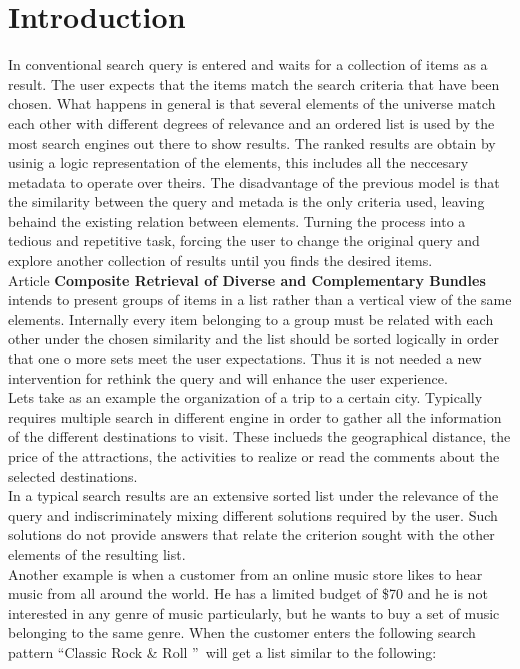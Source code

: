 
\section{Introduction}
In conventional search query is entered and waits for a collection of items as a result. The user expects that the items match the search criteria that have been chosen. What happens in general is that several elements of the universe match each other with different degrees of relevance and an ordered list is used by the most search engines out there to show results. The ranked results are obtain by usinig a logic representation of the elements, this includes all the neccesary metadata to operate over theirs. The disadvantage of the previous model is that the similarity between the query and metada is the only criteria used, leaving behaind the existing relation between elements. Turning the process into a tedious and repetitive task, forcing the user to change the original query and explore another collection of results until you finds the desired items.\\
Article \textbf{Composite Retrieval of Diverse and Complementary Bundles}\cite{compositeRetrival} intends to present groups of items in a list rather than a vertical view of the same elements. Internally every item belonging to a group must be related with each other under the chosen similarity and the list should be sorted logically in order that one o more sets meet the user expectations. Thus it is not needed a new intervention for rethink the query and will enhance the user experience.\\
Lets take as an example the organization of a trip to a certain city. Typically requires multiple search in different engine in order to gather all the information of the different destinations to visit. These inclueds the geographical distance, the price of the attractions, the activities to realize or read the comments about the selected destinations.\\
In a typical search results are an extensive sorted list under the relevance of the query and indiscriminately mixing different solutions required by the user. Such solutions do not provide answers that relate the criterion sought with the other elements of the resulting list.\\
Another example is when a customer from an online music store likes to hear music from all around the world. He has a limited budget of \$70 and he is not interested in any genre of music particularly, but he wants to buy a set of music belonging to the same genre. When the customer enters the following search pattern \textquotedblleft Classic Rock \& Roll  \textquotedblright\ will get a list similar to the following:
